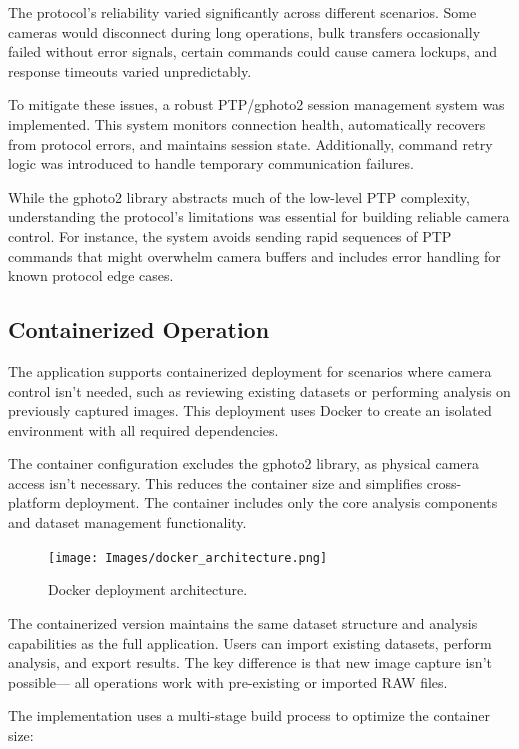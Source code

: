 The protocol's reliability varied significantly across different scenarios. Some cameras would disconnect during long operations, bulk transfers occasionally failed without error signals, certain commands could cause camera lockups, and response timeouts varied unpredictably.

To mitigate these issues, a robust PTP/gphoto2 session management system was implemented. This system monitors connection health, automatically recovers from protocol errors, and maintains session state. Additionally, command retry logic was introduced to handle temporary communication failures.

While the gphoto2 library abstracts much of the low-level PTP complexity, understanding the protocol's limitations was essential for building reliable camera control. For instance, the system avoids sending rapid sequences of PTP commands that might overwhelm camera buffers and includes error handling for known protocol edge cases.

\subsection{Containerized Operation}

The application supports containerized deployment for scenarios where camera control isn't needed, such as reviewing existing datasets or performing analysis on previously captured images. This deployment uses Docker to create an isolated environment with all required dependencies.

The container configuration excludes the gphoto2 library, as physical camera access isn't necessary. This reduces the container size and simplifies cross-platform deployment. The container includes only the core analysis components and dataset management functionality.

\begin{figure}[h]
\centering
\texttt{[image: Images/docker\_architecture.png]}
\caption{Docker deployment architecture.}
\label{fig:docker_architecture}
\end{figure}

The containerized version maintains the same dataset structure and analysis capabilities as the full application. Users can import existing datasets, perform analysis, and export results. The key difference is that new image capture isn't possible— all operations work with pre-existing or imported RAW files.

The implementation uses a multi-stage build process to optimize the container size:


